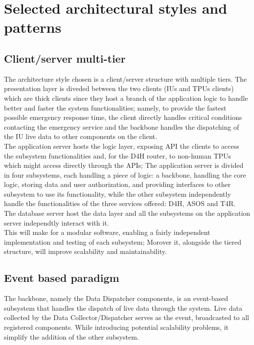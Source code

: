 \section{Selected architectural styles and patterns}
\subsection{Client/server multi-tier}
The architecture style chosen is a client/server structure with multiple tiers. The presentation layer is diveded between the two clients (IUs and TPUs clients) which are thick clients since they host a branch of the application logic to handle better and faster the system functionalities; namely, to provide the fastest possible emergency response time, the client directly handles critical conditions contacting the emergency service and the backbone handles the dispatching of the IU live data to other components on the client. \\
The application server hosts the logic layer, exposing API the clients to access the subsystem functionalities and, for the D4H router, to non-human TPUs which might access directly through the APIs; The application server is divided in four subsystems, each handling a piece of logic: a backbone, handling the core logic, storing data and user authorization, and providing interfaces to other subsystem to use its functionality, while the other subsystem independently handle the functionalities of the three services offered: D4H, ASOS and T4R. \\
The database server host the data layer and all the subsystems on the application server independtly interact with it.
\\
This will make for a modular software, enabling a fairly independent implementation and testing of each subsystem; Morover it, alongside the tiered structure, will improve scalability and maintainability.

\subsection{Event based paradigm}
The backbone, namely the Data Dispatcher components, is an event-based subsystem that handles the dispatch of live data through the system. Live data collected by the Data Collector/Dispatcher serves as the event, broadcasted to all registered components. While introducing potential scalability problems, it simplify the addition of the other subsystem.

